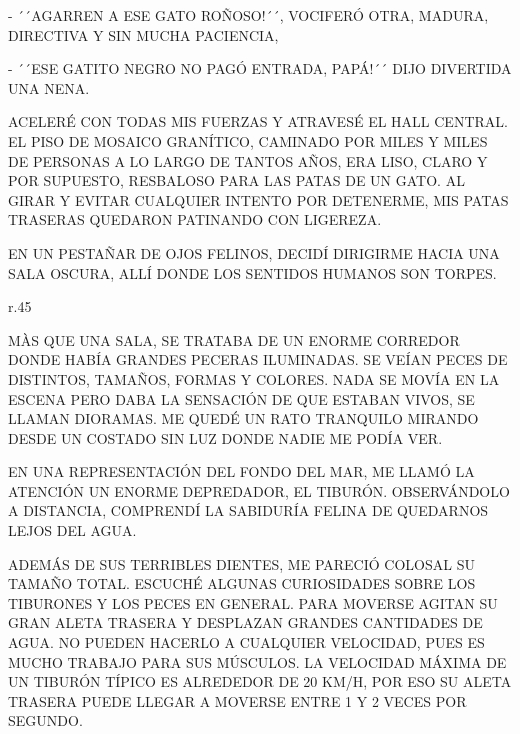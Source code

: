 -  ´´AGARREN A ESE GATO ROÑOSO!´´, VOCIFERÓ OTRA, MADURA, DIRECTIVA Y SIN MUCHA PACIENCIA, 

- ´´ESE GATITO NEGRO NO PAGÓ ENTRADA, PAPÁ!´´ DIJO DIVERTIDA UNA NENA.

ACELERÉ CON TODAS MIS FUERZAS Y ATRAVESÉ EL HALL CENTRAL. EL PISO DE MOSAICO GRANÍTICO, CAMINADO POR MILES Y MILES DE PERSONAS A LO LARGO DE TANTOS AÑOS, ERA LISO, CLARO Y POR SUPUESTO, RESBALOSO PARA LAS PATAS DE UN GATO. AL GIRAR Y EVITAR CUALQUIER INTENTO POR DETENERME, MIS PATAS TRASERAS QUEDARON PATINANDO CON LIGEREZA. 

EN UN PESTAÑAR DE OJOS FELINOS, DECIDÍ DIRIGIRME HACIA UNA SALA OSCURA, ALLÍ DONDE LOS SENTIDOS HUMANOS SON TORPES.

\newpage
{}
\begin{wrapfigure}[8]{r}{.45\textwidth}\vspace{-1.25cm}%
\end{wrapfigure}
MÀS QUE UNA SALA, SE TRATABA DE UN ENORME CORREDOR DONDE HABÍA GRANDES PECERAS ILUMINADAS. SE VEÍAN PECES DE DISTINTOS, TAMAÑOS, FORMAS Y COLORES. NADA SE MOVÍA EN LA ESCENA PERO DABA LA SENSACIÓN DE QUE ESTABAN VIVOS, SE LLAMAN DIORAMAS. ME QUEDÉ UN RATO TRANQUILO MIRANDO DESDE UN COSTADO SIN LUZ DONDE NADIE ME PODÍA VER.

EN UNA REPRESENTACIÓN DEL FONDO DEL MAR, ME LLAMÓ LA ATENCIÓN UN ENORME DEPREDADOR, EL TIBURÓN. OBSERVÁNDOLO A DISTANCIA, COMPRENDÍ LA SABIDURÍA FELINA DE QUEDARNOS LEJOS DEL AGUA.


\newpage
{}

ADEMÁS DE SUS TERRIBLES DIENTES, ME PARECIÓ COLOSAL SU TAMAÑO TOTAL. ESCUCHÉ ALGUNAS CURIOSIDADES SOBRE LOS TIBURONES Y LOS PECES EN GENERAL. PARA MOVERSE AGITAN SU GRAN ALETA TRASERA Y DESPLAZAN GRANDES CANTIDADES DE AGUA. NO PUEDEN HACERLO A CUALQUIER VELOCIDAD, PUES ES MUCHO TRABAJO PARA SUS MÚSCULOS. LA VELOCIDAD MÁXIMA DE UN TIBURÓN TÍPICO ES ALREDEDOR DE 20 KM/H, POR ESO SU ALETA TRASERA PUEDE LLEGAR A MOVERSE ENTRE 1 Y 2 VECES POR SEGUNDO. 

